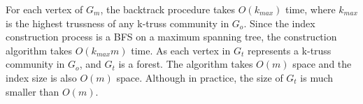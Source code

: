
For each vertex of $G_m$, the backtrack procedure takes $O(k_{max})$ time, where $k_{max}$ is the highest trussness of any k-truss community in $G_o$. Since the index construction process is a BFS on a maximum spanning tree, the \treeindex{} construction algorithm takes $O(k_{max}m)$ time. As each vertex in $G_t$ represents a k-truss community in $G_o$, and $G_t$ is a forest. The algorithm takes $O(m)$ space and the index size is also $O(m)$ space. Although in practice, the size of $G_t$ is much smaller than $O(m)$.

%
